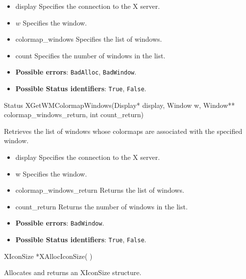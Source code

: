 \documentclass{report}
\begin{document}
\begin{itemize}
            \begin{itemize}
                \item display Specifies the connection to the X server.
                \item $w$ Specifies the window.
                \item colormap\_windows Specifies the list of windows.
                \item count Specifies the number of windows in the list.
            \end{itemize}

            \begin{itemize}
                \item \textbf{Possible errors}: \texttt{BadAlloc}, \texttt{BadWindow}.
                \item \textbf{Possible Status identifiers}: \texttt{True}, \texttt{False}.
            \end{itemize}

            \begin{cppcode}
            Status XGetWMColormapWindows(Display* display, Window w, Window** colormap_windows_return, int count_return)
            \end{cppcode}
            \bigbreak \noindent
            Retrieves the list of windows whose colormaps are associated with the specified window.

            \begin{itemize}
                \item display Specifies the connection to the X server.
                \item w Specifies the window.
                \item colormap\_windows\_return Returns the list of windows.
                \item count\_return Returns the number of windows in the list.
            \end{itemize}

            \begin{itemize}
                \item \textbf{Possible errors}: \texttt{BadWindow}.
                \item \textbf{Possible Status identifiers}: \texttt{True}, \texttt{False}.
            \end{itemize}

            \begin{cppcode}
            XIconSize *XAllocIconSize( )
            \end{cppcode}
            \bigbreak \noindent
            Allocates and returns an XIconSize structure.


\end{itemize}
\end{document}
